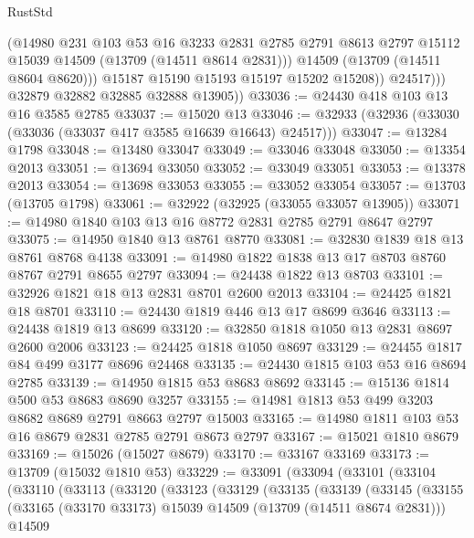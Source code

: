 \begin{lexlean}{RustStd}
\begin{coremodule}
                    (@14980
                      @231
                      @103
                      @53
                      @16
                      @3233
                      @2831
                      @2785
                      @2791
                      @8613
                      @2797
                      @15112
                      @15039
                      @14509
                      (@13709 (@14511 @8614 @2831)))
                    @14509
                    (@13709 (@14511 @8604 @8620)))
                  @15187
                  @15190
                  @15193
                  @15197
                  @15202
                  @15208))
              @24517)))
        @32879
        @32882
        @32885
        @32888
        @13905))
@33036 := @24430 @418 @103 @13 @16 @3585 @2785
@33037 := @15020 @13
@33046 := @32933 (@32936 (@33030 (@33036 (@33037 @417 @3585 @16639 @16643) @24517)))
@33047 := @13284 @1798
@33048 := @13480 @33047
@33049 := @33046 @33048
@33050 := @13354 @2013
@33051 := @13694 @33050
@33052 := @33049 @33051
@33053 := @13378 @2013
@33054 := @13698 @33053
@33055 := @33052 @33054
@33057 := @13703 (@13705 @1798)
@33061 := @32922 (@32925 (@33055 @33057 @13905))
@33071 := @14980 @1840 @103 @13 @16 @8772 @2831 @2785 @2791 @8647 @2797
@33075 := @14950 @1840 @13 @8761 @8770
@33081 := @32830 @1839 @18 @13 @8761 @8768 @4138
@33091 := @14980 @1822 @1838 @13 @17 @8703 @8760 @8767 @2791 @8655 @2797
@33094 := @24438 @1822 @13 @8703
@33101 := @32926 @1821 @18 @13 @2831 @8701 @2600 @2013
@33104 := @24425 @1821 @18 @8701
@33110 := @24430 @1819 @446 @13 @17 @8699 @3646
@33113 := @24438 @1819 @13 @8699
@33120 := @32850 @1818 @1050 @13 @2831 @8697 @2600 @2006
@33123 := @24425 @1818 @1050 @8697
@33129 := @24455 @1817 @84 @499 @3177 @8696 @24468
@33135 := @24430 @1815 @103 @53 @16 @8694 @2785
@33139 := @14950 @1815 @53 @8683 @8692
@33145 := @15136 @1814 @500 @53 @8683 @8690 @3257
@33155 := @14981 @1813 @53 @499 @3203 @8682 @8689 @2791 @8663 @2797 @15003
@33165 := @14980 @1811 @103 @53 @16 @8679 @2831 @2785 @2791 @8673 @2797
@33167 := @15021 @1810 @8679
@33169 := @15026 (@15027 @8679)
@33170 := @33167 @33169
@33173 := @13709 (@15032 @1810 @53)
@33229 := @33091
    (@33094
      (@33101
        (@33104
          (@33110
            (@33113
              (@33120
                (@33123
                  (@33129
                    (@33135
                      (@33139
                        (@33145
                          (@33155
                            (@33165 (@33170 @33173) @15039 @14509 (@13709 (@14511 @8674 @2831)))
                            @14509

\end{coremodule}
\end{lexlean}

